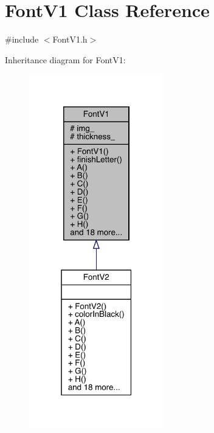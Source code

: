 \hypertarget{class_font_v1}{}\section{Font\+V1 Class Reference}
\label{class_font_v1}


{\ttfamily \#include $<$Font\+V1.\+h$>$}



Inheritance diagram for Font\+V1\+:
\nopagebreak
\begin{figure}[H]
\begin{center}
\leavevmode
\includegraphics[width=166pt]{class_font_v1__inherit__graph}
\end{center}
\end{figure}


